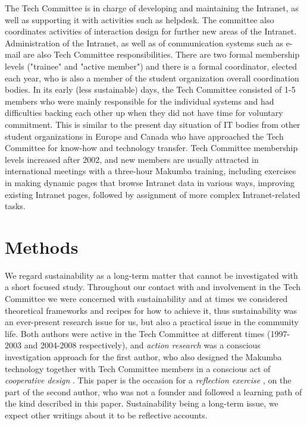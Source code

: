 \documentclass{sig-alt-release2}
\begin{document}
The Tech Committee is in charge of developing and maintaining the Intranet, as well as supporting it with activities such as helpdesk. The committee also coordinates activities of interaction design for further new areas of the Intranet. Administration of the Intranet, as well as of communication systems such as e-mail are also Tech Committee responsibilities. There are two formal membership levels ("trainee" and "active member") and there is a formal coordinator, elected each year, who is also a member of the student organization overall coordination bodies. In its early (less sustainable) days, the Tech Committee consisted of 1-5 members who were mainly responsible for the individual systems and had difficulties backing each other up when they did not have time for voluntary commitment. This is similar to the present day situation of IT bodies from other student organizations in Europe and Canada who have approached the Tech Committee for know-how and technology transfer. Tech Committee membership levels increased after 2002, and new members are usually attracted in international meetings with a three-hour Makumba training, including exercises in making dynamic pages that browse Intranet data in various ways, improving existing Intranet pages, followed by assignment of more complex Intranet-related tasks.

\section{Methods}\label{sec:method}
We regard sustainability as a long-term matter that cannot be investigated with a short focused study. Throughout our contact with and involvement in the Tech Committee we were concerned with sustainability and at times we considered theoretical frameworks and recipes for how to achieve it, thus sustainability was an ever-present research issue for us, but also a practical issue in the community life. Both authors were active in the Tech Committee at different times (1997-2003 and 2004-2008 respectively), and {\it action research} was a conscious investigation approach for the first author, who also designed the Makumba technology together with Tech Committee members in a conscious act of {\it cooperative design} \cite{greenbaum_kyng91}. This paper is the occasion for a {\it reflection exercise} \cite{schon83}, on the part of the second author, who was not a founder and followed a learning path of the kind described in this paper. Sustainability being a long-term issue, we expect other writings about it to be reflective accounts. 
\end{document}
